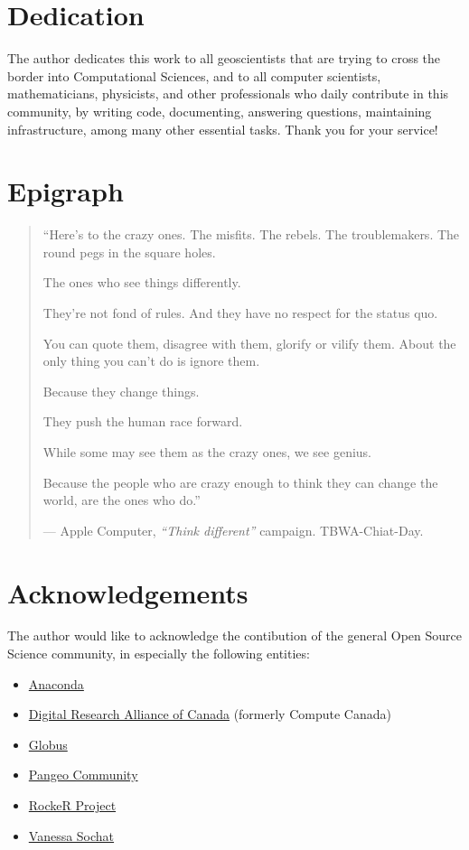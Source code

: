 \documentclass[
]{book}
\providecommand{\tightlist}{%
  \setlength{\itemsep}{0pt}\setlength{\parskip}{0pt}}
\begin{document}
\hypertarget{dedication}{%
\section{Dedication}\label{dedication}}

The author dedicates this work to all geoscientists that are trying to cross the
border into Computational Sciences, and to all computer scientists, mathematicians,
physicists, and other professionals who daily contribute in this community,
by writing code, documenting, answering questions, maintaining infrastructure,
among many other essential tasks. Thank you for your service!

\hypertarget{epigraph}{%
\section{Epigraph}\label{epigraph}}

\begin{quote}
``Here's to the crazy ones.
The misfits.
The rebels.
The troublemakers.
The round pegs in the square holes.

The ones who see things differently.

They're not fond of rules.
And they have no respect for the status quo.

You can quote them, disagree with them, glorify or vilify them.
About the only thing you can't do is ignore them.

Because they change things.

They push the human race forward.

While some may see them as the crazy ones,
we see genius.

Because the people who are crazy enough to think
they can change the world, are the ones who do.''

--- Apple Computer, \emph{``Think different''} campaign. TBWA-Chiat-Day.
\end{quote}

\hypertarget{acknowledgements}{%
\section{Acknowledgements}\label{acknowledgements}}

The author would like to acknowledge the contibution of the general Open Source Science
community, in especially the following entities:

\begin{itemize}
\tightlist
\item
  \href{https://www.anaconda.com/}{Anaconda}
\item
  \href{https://alliancecan.ca/}{Digital Research Alliance of Canada} (formerly Compute Canada)
\item
  \href{https://www.globus.org}{Globus}
\item
  \href{https://pangeo.io}{Pangeo Community}
\item
  \href{https://rocker-project.org}{RockeR Project}
\item
  \href{https://scholar.google.com/citations?user=RTF50S4AAAAJ}{Vanessa Sochat}
\end{itemize}
\end{document}
